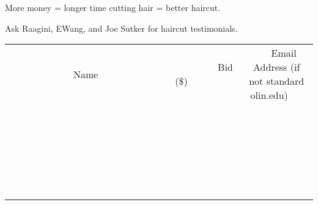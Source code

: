 \documentclass[11pt]{article}
\begin{document}
More money = longer time cutting hair = better haircut.

Ask Raagini, EWang, and Joe Sutker for haircut testimonials.
\\[6ex]
\begin{tabular}{c c c}
~~~~~~~~~~~~~Name~~~~~~~~~~~~~ & ~~~~~~~~~Bid (\$)~~~~~~~~~  & ~~~Email Address (if not standard olin.edu)~~~\\
 & & \\
\hline
 & & \\
\hline
 & & \\
\hline
 & & \\
\hline
 & & \\
\hline
 & & \\
\hline
 & & \\
\hline
 & & \\
\hline
 & & \\
\hline
 & & \\
\hline
 & & \\
\hline
 & & \\
\hline
 & & \\
\hline
 & & \\
\hline
 & & \\
\hline
 & & \\
\hline
 & & \\
\hline
 & & \\
\hline
 & & \\
\hline
 & & \\
\hline
 & & \\
\hline
 & & \\
\hline
 & & \\
\hline
 & & \\
\hline
 & & \\
\hline
 & & \\
\hline
\end{tabular}
\newpage
\end{document}
